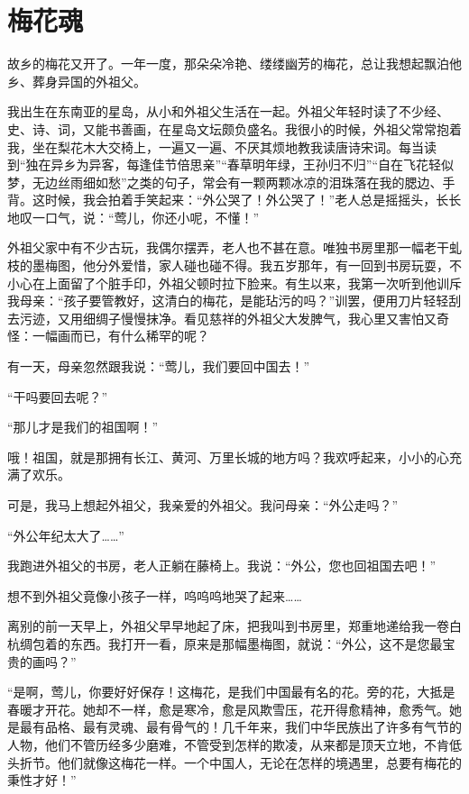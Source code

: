 \documentclass[12pt,UTF-8,openany]{ctexbook}
\begin{document}
\chapter{梅花魂}

\begin{Large}
    
    故乡的梅花又开了。一年一度，那朵朵冷艳、缕缕幽芳的梅花，总让我想起飘泊他乡、葬身异国的外祖父。
    
    我出生在东南亚的星岛，从小和外祖父生活在一起。外祖父年轻时读了不少经、史、诗、词，又能书善画，在星岛文坛颇负盛名。我很小的时候，外祖父常常抱着我，坐在梨花木大交椅上，一遍又一遍、不厌其烦地教我读唐诗宋词。每当读到“独在异乡为异客，每逢佳节倍思亲”“春草明年绿，王孙归不归”“自在飞花轻似梦，无边丝雨细如愁”之类的句子，常会有一颗两颗冰凉的泪珠落在我的腮边、手背。这时候，我会拍着手笑起来：“外公哭了！外公哭了！”老人总是摇摇头，长长地叹一口气，说：“莺儿，你还小呢，不懂！”
    
    外祖父家中有不少古玩，我偶尔摆弄，老人也不甚在意。唯独书房里那一幅老干虬枝的墨梅图，他分外爱惜，家人碰也碰不得。我五岁那年，有一回到书房玩耍，不小心在上面留了个脏手印，外祖父顿时拉下脸来。有生以来，我第一次听到他训斥我母亲：“孩子要管教好，这清白的梅花，是能玷污的吗？”训罢，便用刀片轻轻刮去污迹，又用细绸子慢慢抹净。看见慈祥的外祖父大发脾气，我心里又害怕又奇怪：一幅画而已，有什么稀罕的呢？
    
    有一天，母亲忽然跟我说：“莺儿，我们要回中国去！”
    
    “干吗要回去呢？”
    
    “那儿才是我们的祖国啊！”
    
    哦！祖国，就是那拥有长江、黄河、万里长城的地方吗？我欢呼起来，小小的心充满了欢乐。
    
    可是，我马上想起外祖父，我亲爱的外祖父。我问母亲：“外公走吗？”
    
    “外公年纪太大了……”
    
    我跑进外祖父的书房，老人正躺在藤椅上。我说：“外公，您也回祖国去吧！”
    
    想不到外祖父竟像小孩子一样，呜呜呜地哭了起来……
    
    离别的前一天早上，外祖父早早地起了床，把我叫到书房里，郑重地递给我一卷白杭绸包着的东西。我打开一看，原来是那幅墨梅图，就说：“外公，这不是您最宝贵的画吗？”
    
    “是啊，莺儿，你要好好保存！这梅花，是我们中国最有名的花。旁的花，大抵是春暖才开花。她却不一样，愈是寒冷，愈是风欺雪压，花开得愈精神，愈秀气。她是最有品格、最有灵魂、最有骨气的！几千年来，我们中华民族出了许多有气节的人物，他们不管历经多少磨难，不管受到怎样的欺凌，从来都是顶天立地，不肯低头折节。他们就像这梅花一样。一个中国人，无论在怎样的境遇里，总要有梅花的秉性才好！”
    

\end{Large}
\end{document}
